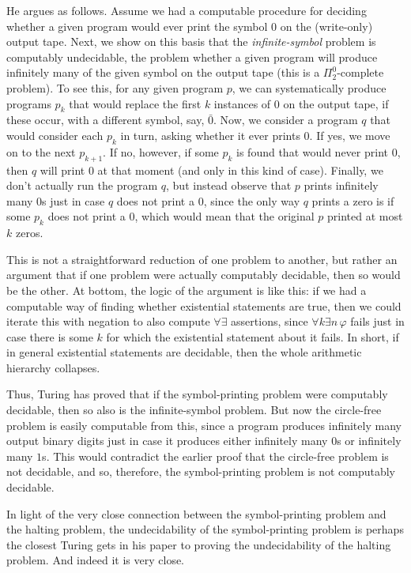 \documentclass[12pt]{amsart}
\begin{document}
He argues as follows. Assume we had a computable procedure for deciding whether a given program would ever print the symbol 0 on the (write-only) output tape. Next, we show on this basis that the \emph{infinite-symbol} problem is computably undecidable, the problem whether a given program will produce infinitely many of the given symbol on the output tape (this is a $\Pi^0_2$-complete problem). To see this, for any given program $p$, we can systematically produce programs $p_k$ that would replace the first $k$ instances of $0$ on the output tape, if these occur, with a different symbol, say, $\bar 0$. Now, we consider a program $q$ that  would consider each $p_k$ in turn, asking whether it ever prints $0$. If yes, we move on to the next $p_{k+1}$. If no, however, if some $p_k$ is found that would never print $0$, then $q$ will print 0 at that moment (and only in this kind of case). Finally, we don't actually run the program $q$, but instead observe that $p$ prints infinitely many 0s just in case $q$ does not print a $0$, since the only way $q$ prints a zero is if some $p_k$ does not print a $0$, which would mean that the original $p$ printed at most $k$ zeros. 

This is not a straightforward reduction of one problem to another, but rather an argument that if one problem were actually computably decidable, then so would be the other. At bottom, the logic of the argument is like this: if we had a computable way of finding whether existential statements are true, then we could iterate this with negation to also compute $\forall\exists$ assertions, since $\forall k\exists n\,\varphi$ fails just in case there is some $k$ for which the existential statement about it fails. In short, if in general existential statements are decidable, then the whole arithmetic hierarchy collapses. 

Thus, Turing has proved that if the symbol-printing problem were computably decidable, then so also is the infinite-symbol problem. But now the circle-free problem is easily computable from this, since a program produces infinitely many output binary digits just in case it produces either infinitely many $0$s or infinitely many $1$s. This would contradict the earlier proof that the circle-free problem is not decidable, and so, therefore, the symbol-printing problem is not computably decidable. 

In light of the very close connection between the symbol-printing problem and the halting problem, the undecidability of the symbol-printing problem is  perhaps the closest Turing gets in his paper to proving the undecidability of the halting problem. And indeed it is very close.
\end{document}
